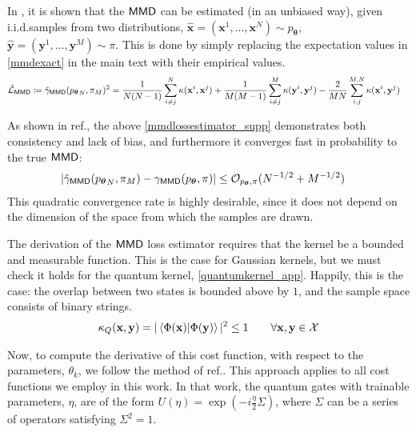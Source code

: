 In , it is shown that the $\operatorname{\textsf{MMD}}$ can be estimated (in an unbiased way), given i.i.d.\@ samples from two distributions, $\hat{\mathbf{x}} = (\mathbf{x}^1,\dots, \mathbf{x}^N) \sim p_{\boldsymbol\theta}$, $\hat{\mathbf{y}} = (\mathbf{y}^1, \dots, \mathbf{y}^M) \sim \pi$.
This is done by simply replacing the expectation values in \eqref{mmdexact} in the main text with their empirical values.
\begin{align}
      \tilde{\mathcal{L}}_{\operatorname{\textsf{MMD}}} &  \coloneqq \tilde{\gamma}_{\operatorname{\textsf{MMD}}}({p_{\boldsymbol\theta}}_N, {\pi}_M)^2 =\frac{1}{N(N-1)}\sum\limits_{i \neq j}^N \kappa(\mathbf{x}^i, \mathbf{x}^j) + \frac{1}{M(M-1)}\sum\limits_{i \neq j}^M \kappa(\mathbf{y}^i, \mathbf{y}^j) -\frac{2}{MN}\sum\limits_{i ,j}^{M, N} \kappa(\mathbf{x}^i, \mathbf{y}^j)   \label{mmdlossestimator_supp}
\end{align}

As shown in ref., the above \eqref{mmdlossestimator_supp} demonstrates both consistency and lack of bias, and furthermore it converges fast in probability to the true $\operatorname{\textsf{MMD}}$:
\begin{align}
|\tilde{\gamma}_{\operatorname{\textsf{MMD}}}({p_{\boldsymbol\theta}}_N, \pi_M)  &-\gamma_{\operatorname{\textsf{MMD}}}(p_{\boldsymbol\theta}, \pi)| \leq \mathcal{O}_{p_{\boldsymbol\theta}, \pi}(N^{-1/2} + M^{-1/2})\label{mmdsamplecomplexity}
\end{align} 
This quadratic convergence rate is highly desirable, since it does not depend on the dimension of the space from which the samples are drawn. 

The derivation of the $\operatorname{\textsf{MMD}}$ loss estimator requires that the kernel be a bounded and measurable function. This is the case for Gaussian kernels, but we must check it holds for the quantum kernel, \eqref{quantumkernel_app}. Happily, this is the case: the overlap between two states is bounded above by $1$, and the sample space consists of binary strings.
\begin{align}
    \kappa_Q(\mathbf{x}, \mathbf{y}) = |\braket{\Phi(\mathbf{x})|\Phi(\mathbf{y})}|^2 \leq 1 \qquad \forall \mathbf{x}, \mathbf{y} \in \mathcal{X}
\end{align}

Now, to compute the derivative of this cost function, with respect to the parameters, $\theta_k$, we follow the method of ref.. This approach applies to all cost functions we employ in this work. In that work, the quantum gates with trainable parameters, $\eta$, are of the form $U(\eta) = \exp(-i\frac{\eta}{2}\Sigma)$, where $\Sigma$ can be a series of operators satisfying $\Sigma^2 = 1$.

